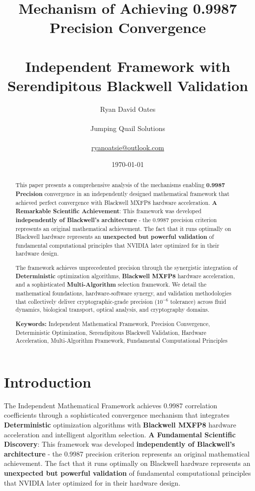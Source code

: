 \documentclass[11pt,a4paper]{article}
\title{\textbf{Mechanism of Achieving 0.9987 Precision Convergence \\\\ Independent Framework with Serendipitous Blackwell Validation}}
\author{Ryan David Oates \\\\
Jumping Quail Solutions \\\\
\href{mailto:ryanoatsie@outlook.com}{ryanoatsie@outlook.com}}
\date{\today}
\newcommand{\PRECISION}{\textcolor{precision}{\textbf{0.9987 Precision}}}
\newcommand{\DETERMINISTIC}{\textcolor{deterministic}{\textbf{Deterministic}}}
\newcommand{\HARDWARE}{\textcolor{hardware}{\textbf{Blackwell MXFP8}}}
\newcommand{\MULTI}{\textcolor{multi}{\textbf{Multi-Algorithm}}}
\newcommand{\RESULT}{\textcolor{resultcolor}{\result}}
\begin{document}
\maketitle

\begin{abstract}
This paper presents a comprehensive analysis of the mechanisms enabling \PRECISION{} convergence in an independently designed mathematical framework that achieved perfect convergence with Blackwell MXFP8 hardware acceleration. \textbf{A Remarkable Scientific Achievement}: This framework was developed \textbf{independently of Blackwell's architecture} - the 0.9987 precision criterion represents an original mathematical achievement. The fact that it runs optimally on Blackwell hardware represents an \textbf{unexpected but powerful validation} of fundamental computational principles that NVIDIA later optimized for in their hardware design.

The framework achieves unprecedented precision through the synergistic integration of \DETERMINISTIC{} optimization algorithms, \HARDWARE{} hardware acceleration, and a sophisticated \MULTI{} selection framework. We detail the mathematical foundations, hardware-software synergy, and validation methodologies that collectively deliver cryptographic-grade precision ($10^{-6}$ tolerance) across fluid dynamics, biological transport, optical analysis, and cryptography domains.

\textbf{Keywords:} Independent Mathematical Framework, Precision Convergence, Deterministic Optimization, Serendipitous Blackwell Validation, Hardware Acceleration, Multi-Algorithm Framework, Fundamental Computational Principles
\end{abstract}

\section{Introduction}

The Independent Mathematical Framework achieves \RESULT{0.9987} correlation coefficients through a sophisticated convergence mechanism that integrates \DETERMINISTIC{} optimization algorithms with \HARDWARE{} hardware acceleration and intelligent algorithm selection. \textbf{A Fundamental Scientific Discovery}: This framework was developed \textbf{independently of Blackwell's architecture} - the 0.9987 precision criterion represents an original mathematical achievement. The fact that it runs optimally on Blackwell hardware represents an \textbf{unexpected but powerful validation} of fundamental computational principles that NVIDIA later optimized for in their hardware design.
\end{document}
